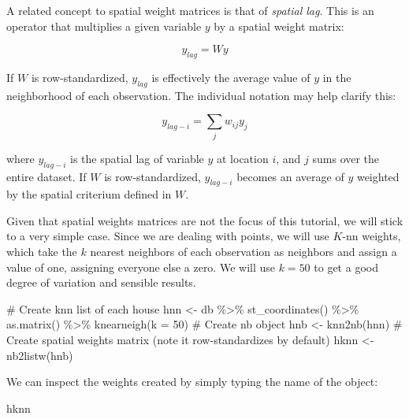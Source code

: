 \documentclass[
  letterpaper,
  DIV=11,
  numbers=noendperiod,
  oneside]{scrreprt}
\newenvironment{Shaded}{\begin{snugshade}}{\end{snugshade}}
\newcommand{\AttributeTok}[1]{\textcolor[rgb]{0.40,0.45,0.13}{#1}}
\newcommand{\CommentTok}[1]{\textcolor[rgb]{0.37,0.37,0.37}{#1}}
\newcommand{\DecValTok}[1]{\textcolor[rgb]{0.68,0.00,0.00}{#1}}
\newcommand{\FunctionTok}[1]{\textcolor[rgb]{0.28,0.35,0.67}{#1}}
\newcommand{\NormalTok}[1]{\textcolor[rgb]{0.00,0.23,0.31}{#1}}
\newcommand{\OtherTok}[1]{\textcolor[rgb]{0.00,0.23,0.31}{#1}}
\newcommand{\SpecialCharTok}[1]{\textcolor[rgb]{0.37,0.37,0.37}{#1}}
\begin{document}
A related concept to spatial weight matrices is that of \emph{spatial
lag}. This is an operator that multiplies a given variable \(y\) by a
spatial weight matrix:

\[
y_{lag} = W y
\]

If \(W\) is row-standardized, \(y_{lag}\) is effectively the average
value of \(y\) in the neighborhood of each observation. The individual
notation may help clarify this:

\[
y_{lag-i} = \displaystyle \sum_j w_{ij} y_j
\]

where \(y_{lag-i}\) is the spatial lag of variable \(y\) at location
\(i\), and \(j\) sums over the entire dataset. If \(W\) is
row-standardized, \(y_{lag-i}\) becomes an average of \(y\) weighted by
the spatial criterium defined in \(W\).

Given that spatial weights matrices are not the focus of this tutorial,
we will stick to a very simple case. Since we are dealing with points,
we will use \(K\)-nn weights, which take the \(k\) nearest neighbors of
each observation as neighbors and assign a value of one, assigning
everyone else a zero. We will use \(k=50\) to get a good degree of
variation and sensible results.

\begin{Shaded}
\begin{Highlighting}[]
\CommentTok{\# Create knn list of each house}
\NormalTok{hnn }\OtherTok{\textless{}{-}}\NormalTok{ db }\SpecialCharTok{\%\textgreater{}\%}
  \FunctionTok{st\_coordinates}\NormalTok{() }\SpecialCharTok{\%\textgreater{}\%}
  \FunctionTok{as.matrix}\NormalTok{() }\SpecialCharTok{\%\textgreater{}\%}
  \FunctionTok{knearneigh}\NormalTok{(}\AttributeTok{k =} \DecValTok{50}\NormalTok{)}
\CommentTok{\# Create nb object}
\NormalTok{hnb }\OtherTok{\textless{}{-}} \FunctionTok{knn2nb}\NormalTok{(hnn)}
\CommentTok{\# Create spatial weights matrix (note it row{-}standardizes by default)}
\NormalTok{hknn }\OtherTok{\textless{}{-}} \FunctionTok{nb2listw}\NormalTok{(hnb)}
\end{Highlighting}
\end{Shaded}

We can inspect the weights created by simply typing the name of the
object:

\begin{Shaded}
\begin{Highlighting}[]
\NormalTok{hknn}
\end{Highlighting}
\end{Shaded}
\end{document}
